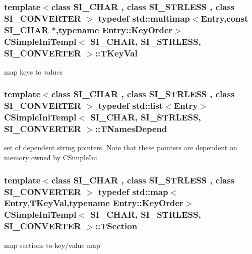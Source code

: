 \subsubsection[{\texorpdfstring{T\+Key\+Val}{TKeyVal}}]{\setlength{\rightskip}{0pt plus 5cm}template$<$class S\+I\+\_\+\+C\+H\+AR , class S\+I\+\_\+\+S\+T\+R\+L\+E\+SS , class S\+I\+\_\+\+C\+O\+N\+V\+E\+R\+T\+ER $>$ typedef std\+::multimap$<${\bf Entry},const S\+I\+\_\+\+C\+H\+AR $\ast$,typename {\bf Entry\+::\+Key\+Order}$>$ {\bf C\+Simple\+Ini\+Templ}$<$ S\+I\+\_\+\+C\+H\+AR, S\+I\+\_\+\+S\+T\+R\+L\+E\+SS, S\+I\+\_\+\+C\+O\+N\+V\+E\+R\+T\+ER $>$\+::{\bf T\+Key\+Val}}\hypertarget{a00007_ae7f0e11d84617214bd479de6332c80e6}{}\label{a00007_ae7f0e11d84617214bd479de6332c80e6}
map keys to values 
\subsubsection[{\texorpdfstring{T\+Names\+Depend}{TNamesDepend}}]{\setlength{\rightskip}{0pt plus 5cm}template$<$class S\+I\+\_\+\+C\+H\+AR , class S\+I\+\_\+\+S\+T\+R\+L\+E\+SS , class S\+I\+\_\+\+C\+O\+N\+V\+E\+R\+T\+ER $>$ typedef std\+::list$<${\bf Entry}$>$ {\bf C\+Simple\+Ini\+Templ}$<$ S\+I\+\_\+\+C\+H\+AR, S\+I\+\_\+\+S\+T\+R\+L\+E\+SS, S\+I\+\_\+\+C\+O\+N\+V\+E\+R\+T\+ER $>$\+::{\bf T\+Names\+Depend}}\hypertarget{a00007_a391b3f3751e06cd9e9de4fb16ac14342}{}\label{a00007_a391b3f3751e06cd9e9de4fb16ac14342}
set of dependent string pointers. Note that these pointers are dependent on memory owned by C\+Simple\+Ini. 
\subsubsection[{\texorpdfstring{T\+Section}{TSection}}]{\setlength{\rightskip}{0pt plus 5cm}template$<$class S\+I\+\_\+\+C\+H\+AR , class S\+I\+\_\+\+S\+T\+R\+L\+E\+SS , class S\+I\+\_\+\+C\+O\+N\+V\+E\+R\+T\+ER $>$ typedef std\+::map$<${\bf Entry},{\bf T\+Key\+Val},typename {\bf Entry\+::\+Key\+Order}$>$ {\bf C\+Simple\+Ini\+Templ}$<$ S\+I\+\_\+\+C\+H\+AR, S\+I\+\_\+\+S\+T\+R\+L\+E\+SS, S\+I\+\_\+\+C\+O\+N\+V\+E\+R\+T\+ER $>$\+::{\bf T\+Section}}\hypertarget{a00007_a2e7963455f680abd0d6901786495a665}{}\label{a00007_a2e7963455f680abd0d6901786495a665}
map sections to key/value map 

